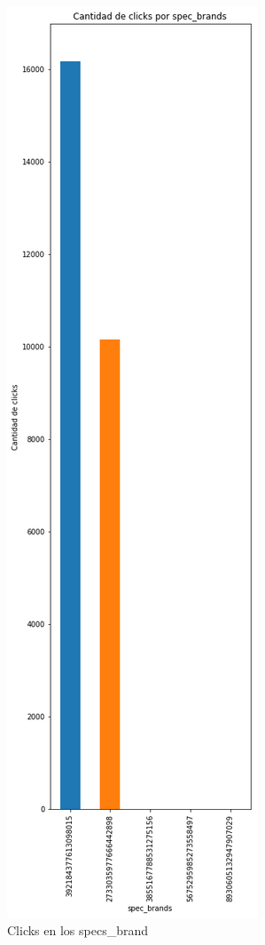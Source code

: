 \documentclass[a4paper, 12pt]{article}
\begin{document}
		\FloatBarrier
		\begin{figure}[h]
			\centering
			\includegraphics[width=\textwidth]{images/clicks/clicks_specs_brand.png}
			\caption{Clicks en los specs_brand}
		\end{figure}
		\FloatBarrier
\end{document}
